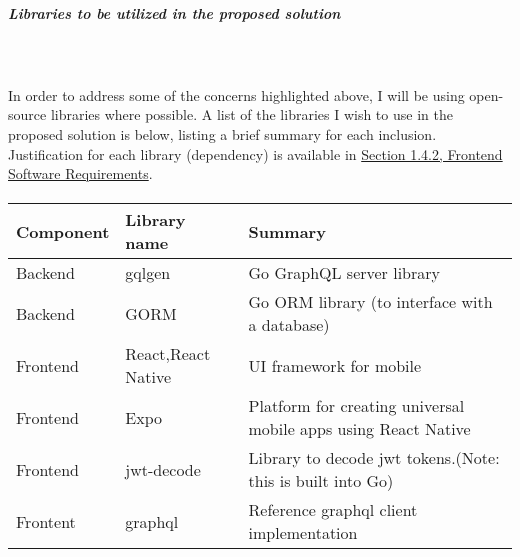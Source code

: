 \documentclass[../../main.tex]{subfiles}
\begin{document}
\subparagraph{Libraries to be utilized in the proposed solution}

\noindent \\\\ In order to address some of the concerns highlighted above,
I will be using open-source libraries where possible.
A list of the libraries I wish to use in the proposed solution is below,
listing a brief summary for each inclusion.
Justification for each library (dependency) is available in
\underline{Section 1.4.2, Frontend Software Requirements}.

\paragraph{} %

\begin{tabular}{ |p{}|p{}|p{}| }
      \hline
      \textbf{Component} & \textbf{Library name}       & \textbf{Summary}                                                    \\
      \hline
      Backend            & gqlgen                      & Go GraphQL server library                                           \\
      \hline
      Backend            & GORM                        & Go ORM library (to interface with a database)                       \\
      \hline
      Frontend           & React,\newline React Native & UI framework for mobile                                             \\
      \hline
      Frontend           & Expo                        & Platform for creating universal mobile apps using React Native      \\
      \hline
      Frontend           & jwt-decode                  & Library to decode jwt tokens.\newline (Note: this is built into Go) \\
      \hline
      Frontent           & graphql                     & Reference graphql client implementation                             \\
      \hline
\end{tabular}
\end{document}
